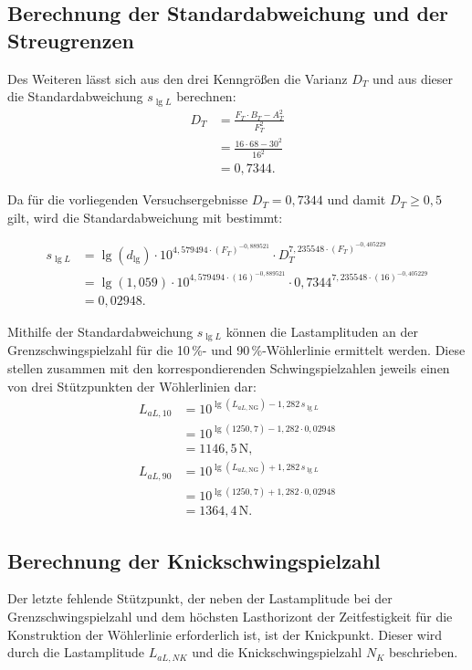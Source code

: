 \subsection{Berechnung der Standardabweichung und der Streugrenzen}
Des Weiteren lässt sich aus den drei Kenngrößen die Varianz $D_T$ und aus dieser die Standardabweichung $s_{\lg L}$ berechnen: 
\begin{align*}
D_T
&=
\frac{F_T\cdot B_T-A_T^2}{F_T^2}\\
&=
\frac{16\cdot 68-30^2}{16^2}\\
&= 0{,}7344.
\end{align*}

Da für die vorliegenden Versuchsergebnisse $D_T = 0{,}7344$ und damit $D_T \geq 0{,}5$ gilt, wird die Standardabweichung mit  bestimmt:

\begin{align*}
s_{\lg L}
&= \lg(d_{\lg})
\cdot 10^{4{,}579494\cdot (F_T)^{-0{,}889521}}
\cdot D_T^{7{,}235548\cdot (F_T)^{-0{,}405229}} \\
&= \lg(1{,}059)
\cdot 10^{4{,}579494\cdot (16)^{-0{,}889521}}
\cdot 0{,}7344^{7{,}235548\cdot (16)^{-0{,}405229}} \\
&= 0{,}02948.
\end{align*}

Mithilfe der Standardabweichung $s_{\lg L}$ können die Lastamplituden an der Grenzschwingspielzahl für die 10\,\%- und 90\,\%-Wöhlerlinie ermittelt werden. 
\clearpage
Diese stellen zusammen mit den korrespondierenden Schwingspielzahlen jeweils einen von drei Stützpunkten der Wöhlerlinien dar:
\begin{align*}
L_{aL,10}
&=
10^{\lg(L_{aL,\mathrm{NG}})
-1{,}282\,s_{\lg L}} \\
&=
10^{\lg(1250{,}7)-1{,}282\cdot0{,}02948} \\
&= 1146{,}5\,\mathrm{N}, \\[1ex]
L_{aL,90}
&=
10^{\lg(L_{aL,\mathrm{NG}})
+1{,}282\,s_{\lg L}} \\
&=
10^{\lg(1250{,}7)+1{,}282\cdot0{,}02948} \\
&= 1364{,}4\,\mathrm{N}.
\end{align*}

	\subsection{Berechnung der Knickschwingspielzahl}\label{chap:Knickschwingspielzahl}
Der letzte fehlende Stützpunkt, der neben der Lastamplitude bei der
Grenzschwingspielzahl und dem höchsten Lasthorizont der Zeitfestigkeit
für die Konstruktion der Wöhlerlinie erforderlich ist, ist der
Knickpunkt. Dieser wird durch die Lastamplitude $L_{aL,NK}$ und die
Knickschwingspielzahl $N_K$ beschrieben.


